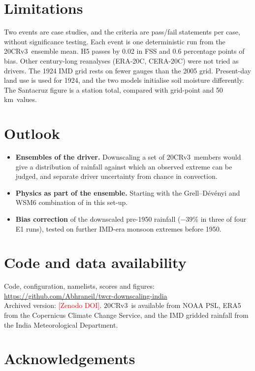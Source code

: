 \documentclass[11pt,a4paper]{article}
\newcommand{\repourl}{\url{https://github.com/Abhraneil/twcr-downscaling-india}}
\newcommand{\zenodo}{\textcolor{red}{[Zenodo DOI]}}
\newcommand{\twcr}{20CRv3}
\newcommand{\km}{\,km}
\begin{document}
\section{Limitations}

Two events are case studies, and the criteria are pass/fail statements per case, without
significance testing. Each event is one deterministic run from the \twcr\ ensemble mean.
H5 passes by 0.02 in FSS and 0.6 percentage points of bias. Other century-long
reanalyses (ERA-20C, CERA-20C) were not tried as drivers. The 1924 IMD grid rests on fewer
gauges than the 2005 grid. Present-day land use is used for 1924, and the two models
initialise soil moisture differently. The Santacruz figure is a station total, compared
with grid-point and 50\km\ values.

\section{Outlook}

\begin{itemize}
\item \textbf{Ensembles of the driver.} Downscaling a set of \twcr\ members would give a
  distribution of rainfall against which an observed extreme can be judged, and separate
  driver uncertainty from chance in convection.
\item \textbf{Physics as part of the ensemble.} Starting with the Grell--Dévényi and WSM6
  combination of \citet{kumar2008} in this set-up.
\item \textbf{Bias correction} of the downscaled pre-1950 rainfall ($-39$\% in three of four
  E1 runs), tested on further IMD-era monsoon extremes before 1950.
\end{itemize}

\section*{Code and data availability}

Code, configuration, namelists, scores and figures:\\
\repourl\\
Archived version: \zenodo.
\twcr\ is available from NOAA PSL, ERA5 from the Copernicus Climate Change Service, and the
IMD gridded rainfall from the India Meteorological Department.

\section*{Acknowledgements}
\end{document}
